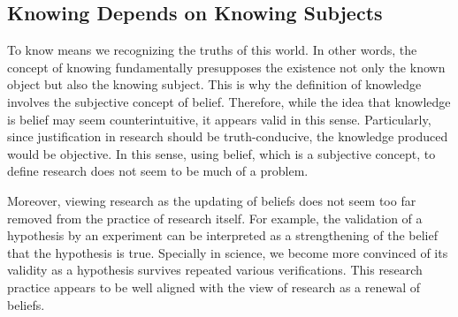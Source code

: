 



\subsection{Knowing Depends on Knowing Subjects}

To know means we recognizing the truths of this world. In other words, the concept of knowing fundamentally presupposes the existence not only the known object but also the knowing subject. This is why the definition of knowledge involves the subjective concept of belief. Therefore, while the idea that knowledge is belief may seem counterintuitive, it appears valid in this sense. Particularly, since justification in research should be truth-conducive, the knowledge produced would be objective. In this sense, using belief, which is a subjective concept, to define research does not seem to be much of a problem.

Moreover, viewing research as the updating of beliefs does not seem too far removed from the practice of research itself. For example, the validation of a hypothesis by an experiment can be interpreted as a strengthening of the belief that the hypothesis is true. Specially in science, we become more convinced of its validity as a hypothesis survives repeated various verifications. This research practice appears to be well aligned with the view of research as a renewal of beliefs.



